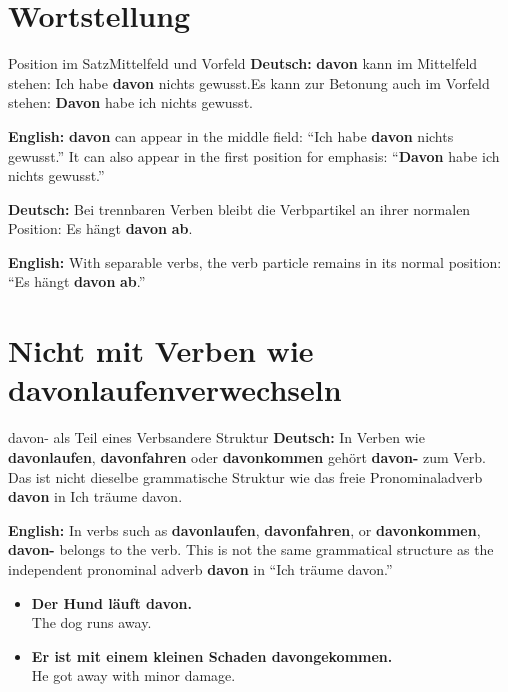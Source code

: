 \documentclass[a4paper,11pt]{article}
\newcommand{\GermanText}[1]{\textbf{Deutsch: }#1\par}
\newcommand{\EnglishText}[1]{{\small\color{SoftGray}\textbf{English: }#1\par}}
\newcommand{\ExampleItem}[2]{\item \textbf{#1}\\{\small\color{SoftGray}#2}}
\begin{document}
    \section{Wortstellung}

        \begin{grammarentry}{Position im Satz}{Mittelfeld und Vorfeld}
            \GermanText{\textbf{davon} kann im Mittelfeld stehen: \glqq Ich habe \textbf{davon} nichts gewusst.\grqq Es kann zur Betonung auch im Vorfeld stehen: \glqq \textbf{Davon} habe ich nichts gewusst.\grqq}
            \EnglishText{\textbf{davon} can appear in the middle field: ``Ich habe \textbf{davon} nichts gewusst.'' It can also appear in the first position for emphasis: ``\textbf{Davon} habe ich nichts gewusst.''}

            \GermanText{Bei trennbaren Verben bleibt die Verbpartikel an ihrer normalen Position: \glqq Es hängt \textbf{davon} \textbf{ab}.\grqq}
            \EnglishText{With separable verbs, the verb particle remains in its normal position: ``Es hängt \textbf{davon} \textbf{ab}.''}
        \end{grammarentry}

    \section{Nicht mit Verben wie \glqq davonlaufen\grqq verwechseln}

        \begin{grammarentry}{davon- als Teil eines Verbs}{andere Struktur}
            \GermanText{In Verben wie \textbf{davonlaufen}, \textbf{davonfahren} oder \textbf{davonkommen} gehört \textbf{davon-} zum Verb. Das ist nicht dieselbe grammatische Struktur wie das freie Pronominaladverb \textbf{davon} in \glqq Ich träume davon.\grqq}
            \EnglishText{In verbs such as \textbf{davonlaufen}, \textbf{davonfahren}, or \textbf{davonkommen}, \textbf{davon-} belongs to the verb. This is not the same grammatical structure as the independent pronominal adverb \textbf{davon} in ``Ich träume davon.''}
        \end{grammarentry}

        \begin{exbox}
            \begin{itemize}
                \ExampleItem{Der Hund läuft davon.}{The dog runs away.}
                \ExampleItem{Er ist mit einem kleinen Schaden davongekommen.}{He got away with minor damage.}
            \end{itemize}
        \end{exbox}
\end{document}
